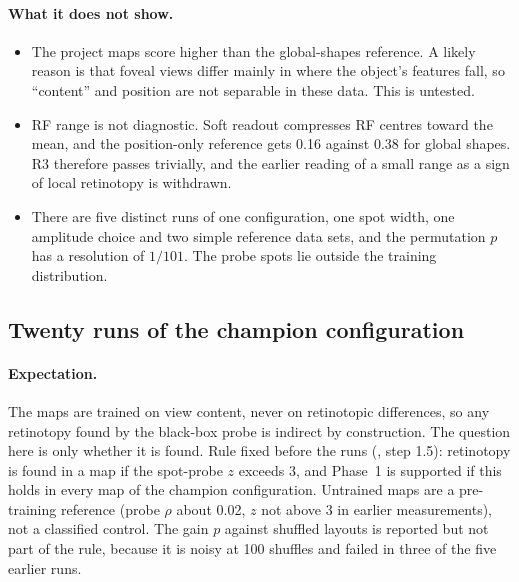 \documentclass[11pt,a4paper]{article}
\newcommand{\code}[1]{\path{#1}}
\begin{document}
\paragraph{What it does not show.}
\begin{itemize}[nosep]
  \item The project maps score higher than the global-shapes reference. A likely reason
    is that foveal views differ mainly in where the object's features fall, so
    ``content'' and position are not separable in these data. This is untested.
  \item RF range is not diagnostic. Soft readout compresses RF centres toward the
    mean, and the position-only reference gets 0.16 against 0.38 for global shapes.
    R3 therefore passes trivially, and the earlier reading of a small range as a sign
    of local retinotopy is withdrawn.
  \item There are five distinct runs of one configuration, one spot width, one
    amplitude choice and two simple reference data sets, and the permutation $p$ has
    a resolution of $1/101$. The probe spots lie outside the training distribution.
\end{itemize}

\subsection*{Twenty runs of the champion configuration}
\label{sec:champion}

\paragraph{Expectation.} The maps are trained on view content, never on retinotopic
differences, so any retinotopy found by the black-box probe is indirect by
construction. The question here is only whether it is found. Rule fixed before the
runs (\code{predictive_remapping.md}, step 1.5): retinotopy is found in a map if the
spot-probe $z$ exceeds 3, and Phase~1 is supported if this holds in every map of the
champion configuration. Untrained maps are a pre-training reference (probe $\rho$
about 0.02, $z$ not above 3 in earlier measurements), not a classified control. The
gain $p$ against shuffled layouts is reported but not part of the rule, because it is
noisy at 100 shuffles and failed in three of the five earlier runs.
\end{document}
